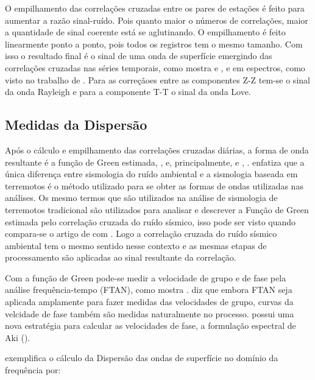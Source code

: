 \documentclass[paper,twocolumn]{geophysics}
\begin{document}
O empilhamento das correlações cruzadas entre os pares de estações é feito para aumentar a razão sinal-ruído. Pois quanto maior o números de correlações, maior a quantidade de sinal coerente está se aglutinando. O empilhamento é feito linearmente ponto a ponto, pois todos os registros tem o mesmo tamanho.  Com isso o resultado  final é o sinal de uma onda de superfície emergindo das correlações cruzadas nas séries temporais, como mostra \cite{bensen_processing_2007} e \cite{lin_surface_2008}, e em espectros, como visto no trabalho de \cite{ekstrom_determination_2009}. Para as correçãoes entre as componentes Z-Z tem-se o sinal da onda Rayleigh e para a componente T-T o sinal da onda Love. 

\subsection*{Medidas da Dispersão}

Após o cálculo e empilhamento das correlações cruzadas diárias, a forma de onda resultante é a função de Green estimada, \cite{campillo_long-range_2003}, \cite{shapiro_emergence_2004} e, principalmente, \cite{wapenaar_retrieving_2004} e \cite{bensen_processing_2007}, \cite{wapenaar_tutorial_2010}. \cite{lin_surface_2008} enfatiza que a única diferença entre sismologia do ruído ambiental e a sismologia baseada em terremotos é o método utilizado para se obter as formas de ondas utilizadas nas análises. Os mesmo termos que são utilizados na análise de sismologia de terremotos tradicional são utilizados para analisar e descrever a Função de Green estimada pelo correlação cruzada do ruído sísmico, isso pode ser visto quando compara-se o artigo de \cite{levshin_peculiarities_1992} com \cite{bensen_processing_2007}. Logo a correlação cruzada do ruído sísmico ambiental tem o mesmo sentido nesse contexto e as mesmas etapas de processamento são aplicadas ao sinal resultante da correlação.

Com a função de Green pode-se medir a velocidade de grupo e de fase pela análise frequência-tempo (FTAN), como mostra \cite{levshin_peculiarities_1992}. \cite{bensen_processing_2007} diz que embora FTAN seja aplicada amplamente para fazer medidas das velocidades de grupo, curvas da velcidade de fase também são medidas naturalmente no processo. \cite{ekstrom_determination_2009} possui uma nova estratégia para calcular as velocidades de fase, a formulação espectral de Aki (\cite{aki_space_1957}).

\cite{bensen_processing_2007} exemplifica o cálculo da Dispersão das ondas de superfície no domínio da frequência por:
\end{document}
